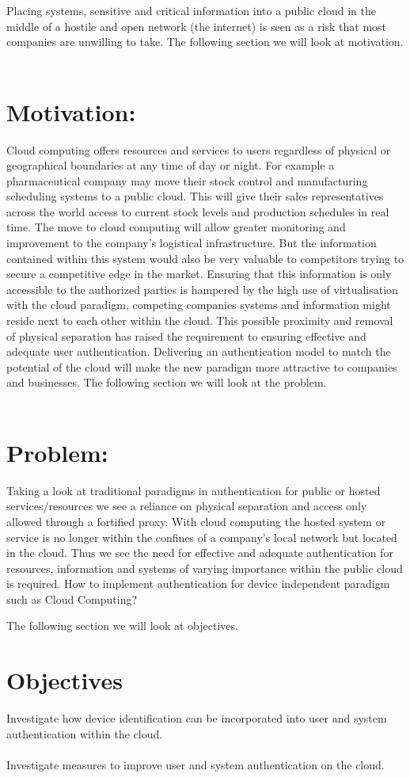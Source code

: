 \documentclass[11pt]{article}
\begin{document}
Placing systems, sensitive and critical information into a public cloud in the middle of a hostile and open network (the internet) is seen as a risk that most companies are unwilling to take. The following section we will look at motivation.
\\ \\


\section{Motivation:}
Cloud computing offers resources and services to users regardless of physical or geographical boundaries at any time of day or night. For example a pharmaceutical company may move their stock control and manufacturing scheduling systems to a public cloud. This will give their sales representatives across the world access to current stock levels and production schedules in real time. The move to cloud computing will allow greater monitoring and improvement to the company's logistical infrastructure. But the information contained within this system would also be very valuable to competitors trying to secure a competitive edge in the market. Ensuring that this information is only accessible to the authorized parties is hampered by the high use of virtualisation with the cloud paradigm, competing companies systems and information might reside next to each other within the cloud. This possible proximity and removal of physical separation has raised the requirement to ensuring effective and adequate user authentication. Delivering an authentication model to match the potential of the cloud will make the new paradigm more attractive to companies and businesses. The following section we will look at the problem. \\ \\

\section{Problem:}
Taking a look at traditional paradigms in authentication for public or hosted services/resources we see a reliance on physical separation and access only allowed through a fortified proxy. With cloud computing the hosted system or service is no longer within the confines of a company's local network but located in the cloud. Thus we see the need for effective and adequate authentication for resources, information and systems of varying importance within the public cloud is required.  
How to implement authentication for device independent paradigm such as Cloud Computing? 

The following section we will look at objectives.

\section{Objectives}
Investigate how device identification can be incorporated into user and system authentication within the cloud.\\ \\
Investigate measures to improve user and system authentication on the cloud. 
\end{document}
